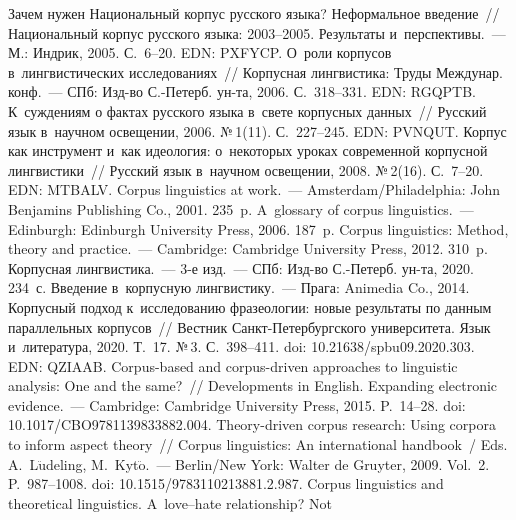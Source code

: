 \begin{multicols}{2}
{\small\frenchspacing
 {\baselineskip=10.6pt
 \begin{thebibliography}{99}
 Зачем нужен Национальный корпус русского языка? Неформальное 
введение~// Национальный корпус русского языка: 2003--2005. Результаты и~перспективы.~--- М.: Индрик, 2005.  
С.~6--20. EDN: PXFYCP.
 О~роли корпусов в~лингвистических исследованиях~// Корпусная 
лингвистика: Труды Междунар. конф.~--- СПб: Изд-во С.-Петерб. ун-та, 2006. 
С.~318--331. EDN: RGQPTB.
 К~суждениям о фактах русского языка в~свете корпусных данных~// 
Русский язык в~научном освещении, 2006. №\,1(11). С.~227--245. EDN: \mbox{PVNQUT}.
 Корпус как инструмент и~как идеология: о~некоторых уроках 
современной корпусной лингвистики~// Русский язык в~научном освещении, 2008. 
№\,2(16). С.~7--20. EDN: MTBALV.
 Corpus linguistics at work.~--- Amsterdam/Philadelphia: John 
Benjamins Publishing Co., 2001.  235~p.
 A~glossary of corpus linguistics.~--- Edinburgh: 
Edinburgh University Press, 2006. 187~p.
 Corpus linguistics: Method, theory and practice.~---  Cambridge: 
Cambridge University Press, 2012. 310~p.
 Корпусная лингвистика.~--- 3-е изд.~--- СПб: Изд-во С.-Петерб. ун-та, 2020. 234~с.
 Введение в~корпусную лингвистику.~--- Прага: Animedia 
Co., 2014. %
 Корпусный подход к~исследованию фразеологии: новые 
результаты по данным параллельных корпусов~// Вестник Санкт-Пе\-тер\-бург\-ско\-го 
университета. Язык и~литература, 2020. Т.~17. №\,3. С.~398--411. doi: 
10.21638/spbu09.2020.303. EDN: QZIAAB.
 Corpus-based and corpus-driven approaches to linguistic analysis: One and 
the same?~// Developments in English. Expanding electronic evidence.~--- Cambridge: 
Cambridge University Press, 2015. P.~14--28. doi: 10.1017/CBO9781139833882.004.
 Theory-driven corpus research: Using corpora to inform aspect theory~// Corpus 
linguistics: An international handbook~/ Eds. A.~L$\ddot{\mbox{u}}$deling, 
M.~Kyt$\ddot{\mbox{o}}$.~--- Berlin/New York: Walter de Gruyter, 2009.  Vol.~2. P.~987--1008. doi: 
10.1515/9783110213881.2.987.
 Corpus linguistics and theoretical linguistics. A~love--hate relationship? Not 

\end{thebibliography}}}
\end{multicols}
